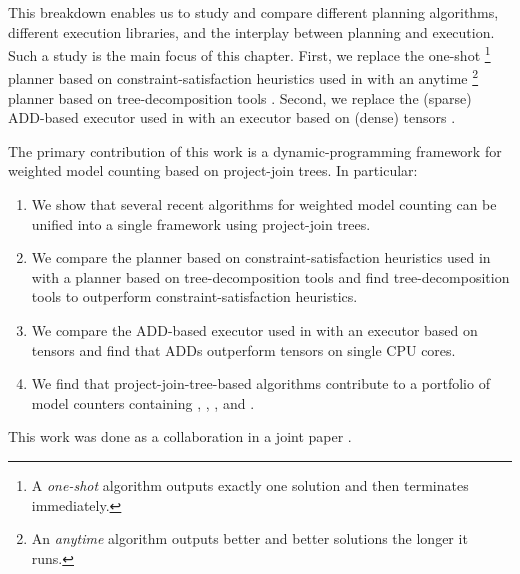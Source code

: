 This breakdown enables us to study and compare different planning algorithms, different execution libraries, and the interplay between planning and execution.
Such a study is the main focus of this chapter. 
First, we replace the one-shot%
\footnote{A \emph{one-shot} algorithm outputs exactly one solution and then terminates immediately.}
planner based on constraint-satisfaction heuristics \cite{dechter03} used in \cite{DPV20,phan2019weighted} with an anytime%
\footnote{An \emph{anytime} algorithm outputs better and better solutions the longer it runs.} planner based on tree-decomposition tools \cite{MPPV04,AMW17,HS18,Tamaki17}.
Second, we replace the (sparse) ADD-based executor \cite{bahar1997algebraic} used in \cite{DPV20,phan2019weighted} with an executor based on (dense) tensors \cite{KKCLA17}.

The primary contribution of this work is a dynamic-programming framework for weighted model counting based on project-join trees.
In particular:
\begin{enumerate}
    \item We show that several recent algorithms for weighted model counting \cite{DPV20,fichte2020exploiting} can be unified into a single framework using project-join trees.
    \item We compare the planner based on constraint-satisfaction heuristics \cite{dechter03} used in \cite{DPV20,phan2019weighted} with a planner based on tree-decomposition tools \cite{robertson1984graph,AMW17,HS18,Tamaki17} and find tree-decomposition tools to outperform constraint-satisfaction heuristics.
    \item We compare the ADD-based executor \cite{bahar1997algebraic} used in \cite{DPV20,phan2019weighted} with an executor based on tensors \cite{KKCLA17} and find that ADDs outperform tensors on single CPU cores.
    \item We find that project-join-tree-based algorithms contribute to a portfolio of model counters containing \cachet{} \cite{sang2004combining}, \ctd{} \cite{darwiche2004new}, \df{} \cite{LM17}, and \minictd{} \cite{OD15}.
\end{enumerate}
This work was done as a collaboration in a joint paper \cite{dudek2020dpmc}.

